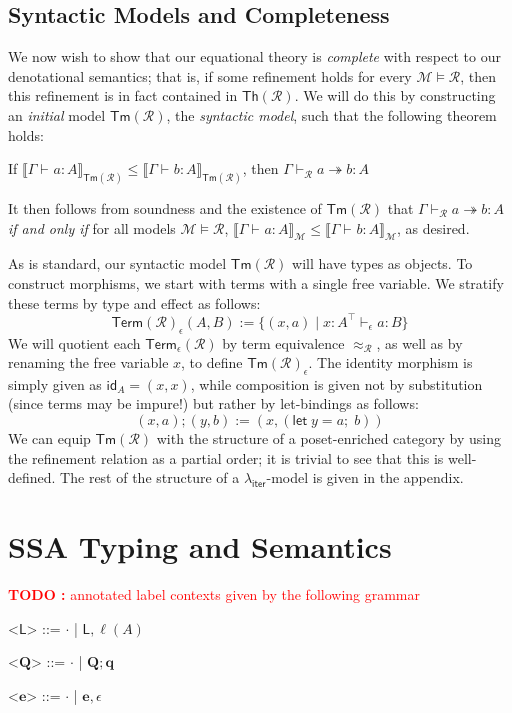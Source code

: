 \documentclass[acmsmall,screen,review]{acmart}
\newcounter{todos}
\newcommand{\TODO}[1]{{
  \stepcounter{todos}
  \begin{center}\large{\textcolor{red}{\textbf{TODO \arabic{todos}:} #1}}\end{center}
}}
\newcommand{\mc}[1]{\ensuremath{\mathcal{#1}}}
\newcommand{\mb}[1]{\ensuremath{\mathbf{#1}}}
\newcommand{\ms}[1]{\ensuremath{\mathsf{#1}}}
\newcommand{\letexpr}[3]{\ensuremath{\ms{let}\;#1 = #2;\;#3}}
\newcommand{\lhyp}[2]{#1(#2)}
\newcommand{\hasty}[4]{#1 \vdash_{#2} #3: {#4}}
\newcommand{\tref}{\twoheadrightarrow}
\newcommand{\tmle}[5]{#1 \vdash_{#2} #3 \tref #4 : {#5}}
\newcommand{\dnt}[1]{\llbracket{#1}\rrbracket}
\newcommand{\subiterexp}{\texorpdfstring{\(\lambda_{\ms{iter}}\)}{lambda-iter}}
\begin{document}
\subsection{Syntactic Models and Completeness}

We now wish to show that our equational theory is \emph{complete} with respect to our denotational
semantics; that is, if some refinement holds for every $\mc{M} \models \mc{R}$, then this refinement
is in fact contained in $\ms{Th}(\mc{R})$. We will do this by constructing an \emph{initial} model
$\ms{Tm}(\mc{R})$, the \emph{syntactic model}, such that the following theorem holds:
\begin{theorem}[Completeness]
  If $\dnt{\hasty{\Gamma}{}{a}{A}}_{\ms{Tm}(\mc{R})} \leq
  \dnt{\hasty{\Gamma}{}{b}{A}}_{\ms{Tm}(\mc{R})}$, then
  $
  \tmle{\Gamma}{\mc{R}}{a}{b}{A}
  $
\end{theorem}
It then follows from soundness and the existence of $\ms{Tm}(\mc{R})$ that
$\tmle{\Gamma}{\mc{R}}{a}{b}{A}$ \emph{if and only if} for all models $\mc{M} \models \mc{R}$,
$\dnt{\hasty{\Gamma}{}{a}{A}}_{\mc{M}} \leq \dnt{\hasty{\Gamma}{}{b}{A}}_{\mc{M}}$, as desired.

As is standard, our syntactic model $\ms{Tm}(\mc{R})$ will have types as objects. To construct
morphisms, we start with terms with a single free variable. We stratify these terms by type and
effect as follows:
$$
\ms{Term}(\mc{R})_\epsilon(A, B) := \{(x, a) \mid \hasty{x : A^\top}{\epsilon}{a}{B}\}
$$
We will quotient each $\ms{Term}_\epsilon(\mc{R})$ by term equivalence $\approx_{\mc{R}}$, as well
as by renaming the free variable $x$, to define $\ms{Tm}(\mc{R})_\epsilon$. The identity morphism is
simply given as $\ms{id}_A = (x, x)$, while composition is given not by substitution (since terms
may be impure!) but rather by let-bindings as follows:
$$
(x, a) ; (y, b) := (x, (\letexpr{y}{a}{b}))
$$
We can equip $\ms{Tm}(\mc{R})$ with the structure of a poset-enriched
category by using the refinement relation as a partial order; it is trivial to see that this is
well-defined. The rest of the structure of a \subiterexp{}-model is given in the appendix.

\section{SSA Typing and Semantics}

\TODO{annotated label contexts given by the following grammar}

\begin{grammar}
  <\(\ms{L}\)> ::= \(\cdot\) \;|\; \(\ms{L}, \lhyp{\ell}{A}\)

  <\(\mb{Q}\)> ::= \(\cdot\) \;|\; \(\mb{Q}; \mb{q}\)

  <\(\mb{e}\)> ::= \(\cdot\) \;|\; \(\mb{e}, \epsilon\)
\end{grammar}
\end{document}
